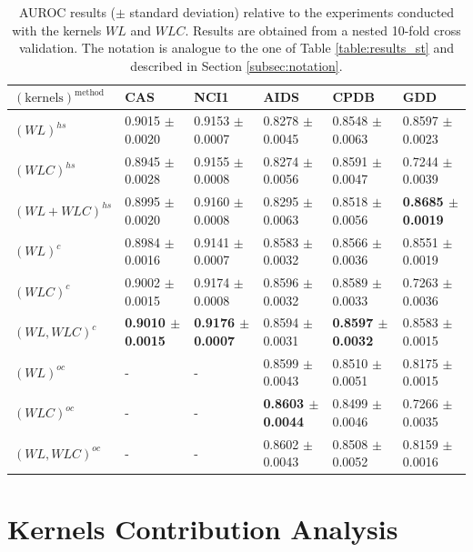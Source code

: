 \begin{landscape}
\begin{table}[ht]
        \begin{tabular}{|l|l|l|l|l|l|}
            \hline
            $\mathrm{(kernels)^{method}}$&CAS&NCI1&AIDS&CPDB&GDD\\
            \hline
            $(WL)^{hs}$&0.9015 $\pm$ 0.0020&0.9153 $\pm$ 0.0007&0.8278 $\pm$ 0.0045&0.8548 $\pm$ 0.0063&0.8597 $\pm$ 0.0023\\
            $(WLC)^{hs}$&0.8945 $\pm$ 0.0028&0.9155 $\pm$ 0.0008&0.8274 $\pm$ 0.0056&0.8591 $\pm$ 0.0047&0.7244 $\pm$  0.0039\\
            $(WL + WLC)^{hs}$&0.8995 $\pm$ 0.0020&0.9160 $\pm$ 0.0008&0.8295 $\pm$ 0.0063&0.8518 $\pm$ 0.0056&\textbf{0.8685 $\pm$ 0.0019}\\
            \hline
            $(WL)^c$&0.8984 $\pm$ 0.0016&0.9141 $\pm$ 0.0007&0.8583 $\pm$ 0.0032&0.8566 $\pm$  0.0036&0.8551 $\pm$ 0.0019\\
            $(WLC)^c$&0.9002 $\pm$ 0.0015&0.9174 $\pm$ 0.0008&0.8596 $\pm$ 0.0032&0.8589 $\pm$ 0.0033&0.7263 $\pm$ 0.0036\\
            $(WL, WLC)^c$&\textbf{0.9010 $\pm$ 0.0015}&\textbf{0.9176 $\pm$ 0.0007}&0.8594 $\pm$ 0.0031 &\textbf{0.8597 $\pm$ 0.0032}&0.8583 $\pm$ 0.0015\\
            \hline
            $(WL)^{oc}$&-&-&0.8599 $\pm$ 0.0043&0.8510 $\pm$ 0.0051&0.8175 $\pm$ 0.0015\\
            $(WLC)^{oc}$&-&-&\textbf{0.8603 $\pm$ 0.0044}&0.8499 $\pm$ 0.0046&0.7266 $\pm$ 0.0035\\
            $(WL, WLC)^{oc}$&-&-&0.8602 $\pm$ 0.0043&0.8508 $\pm$ 0.0052&0.8159 $\pm$ 0.0016\\
            \hline
        \end{tabular}
        \caption{AUROC results ($\pm$ standard deviation) relative to the experiments
                conducted with the kernels $WL$ and $WLC$. Results are
                obtained from a nested 10-fold cross validation.
                The notation is analogue to the one of Table \ref{table:results_st} and described in Section \ref{subsec:notation}.}
        \label{table:results_wl}
    \end{table}

\end{landscape}

\section{Kernels Contribution Analysis}
\label{sec:kca}

